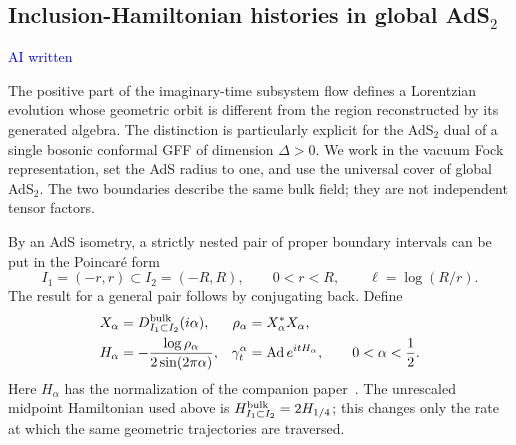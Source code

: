 \documentclass[a4paper,11pt]{article}
\theoremstyle{definition}
\newcommand{\NL}[1]{\textcolor{blue}{#1}}
\begin{document}
\subsection{Inclusion-Hamiltonian histories in global
\texorpdfstring{AdS$_2$}{AdS2}}
\label{subsec:ads2-inclusion-histories}

\NL{AI written}

The positive part of the imaginary-time subsystem flow defines a
Lorentzian evolution whose geometric orbit is different from the
region reconstructed by its generated algebra. The distinction is
particularly explicit for the AdS$_2$ dual of a single bosonic
conformal GFF of dimension $\Delta>0$. We work in the vacuum Fock
representation, set the AdS radius to one, and use the universal cover
of global AdS$_2$. The two boundaries describe the same bulk field;
they are not independent tensor factors.

By an AdS isometry, a strictly nested pair of proper boundary intervals
can be put in the Poincar\'e form
\begin{equation}
 I_1=(-r,r)\subset I_2=(-R,R),
 \qquad 0<r<R,
 \qquad \ell=\log(R/r).
 \label{eq:ads2-history-pair}
\end{equation}
The result for a general pair follows by conjugating back. Define
\begin{equation}
 \begin{aligned}
 X_\alpha&=D^{\rm bulk}_{I_1\subset I_2}(i\alpha),
 &\rho_\alpha&=X_\alpha^*X_\alpha,\\
 H_\alpha&=-\frac{\log\rho_\alpha}{2\sin(2\pi\alpha)},
 &\gamma_t^\alpha&=\operatorname{Ad}e^{itH_\alpha},
 \qquad 0<\alpha<\frac12 .
 \end{aligned}
 \label{eq:ads2-history-dynamics}
\end{equation}
Here $H_\alpha$ has the normalization of the companion
paper~\cite{companion}. The unrescaled midpoint Hamiltonian used above
is $H^{\rm bulk}_{I_1\subset I_2}=2H_{1/4}$; this changes only the
rate at which the same geometric trajectories are traversed.
\end{document}
